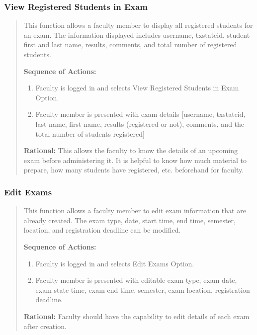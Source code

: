    \subsubsection{View Registered Students in Exam}
   \begin{quote} %
         This function allows a faculty member to display all registered
         students for an exam. The information displayed includes username,
         txstateid, student first and last name, results, comments, and total
         number of registered students.
         
         \textbf{Sequence of Actions:}
         \begin{enumerate}
            \item Faculty is logged in and selects View Registered Students in Exam
               Option.
            \item Faculty member is presented with exam details [username,
               txstateid, last name, first name, results (registered or not),
               comments, and the total number of students registered]
         \end{enumerate}

         \textbf{Rational:}
         This allows the faculty to know the details of an upcoming exam before
         administering it. It is helpful to know how much material to prepare,
         how many students have registered, etc. beforehand for faculty.
   \end{quote} %

   \subsubsection{Edit Exams}
   \begin{quote} %
         This function allows a faculty member to edit exam information that are already
         created. The exam type, date, start time, end time, semester,
         location, and registration deadline can be modified. 
         
         \textbf{Sequence of Actions:}
         \begin{enumerate}
            \item Faculty is logged in and selects Edit Exams Option.
            \item Faculty member is presented with editable exam type, exam
               date, exam state time, exam end time, semester, exam location,
               registration deadline. 
         \end{enumerate}

         \textbf{Rational:}
         Faculty should have the capability to edit details of each exam after
         creation.
   \end{quote} %

